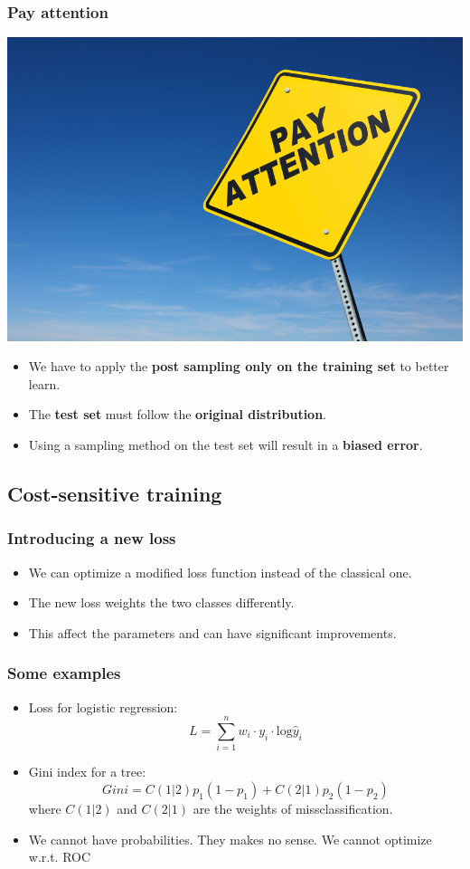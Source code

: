 \documentclass[9pt]{beamer}
\begin{document}
\begin{frame}
\frametitle{Pay attention}
\begin{center}
\includegraphics[scale=0.8]{images/payattention.jpeg}
\end{center}
\vspace{3mm}

\begin{itemize}
\item<1 -> We have to apply the \textbf{post sampling only on the training set} to better learn.
\item<2 -> The \textbf{test set} must follow the \textbf{original distribution}.
\item<3 -> Using a sampling method on the test set will result in a \textbf{biased error}.
\end{itemize}

\end{frame}
\subsection{Cost-sensitive training}
\begin{frame}
\frametitle{Introducing a new loss}
\begin{itemize}
\item<1->  We can optimize a modified loss function instead of the classical one.
\item<2->  The new loss weights the two classes differently.
\item<3->  This affect the parameters and can have significant improvements.
\end{itemize}
\end{frame}

\begin{frame}
\frametitle{Some examples}
\begin{itemize}
\item<1->  Loss for logistic regression:
$$
\textit{L} = \sum_{i = 1}^{n}w_i\cdot y_i \cdot \mbox{log}\hat{y}_i
$$
\item<2->  Gini index for a tree:
$$
Gini = C(1|2) p_1 (1-p_1) + C(2|1) p_2 (1-p_2)
$$
where $C(1|2)$ and $C(2|1)$ are the weights of missclassification.
\item<3->  We cannot have probabilities. They makes no sense. We cannot optimize w.r.t. ROC
\end{itemize}
\end{frame}
\end{document}
